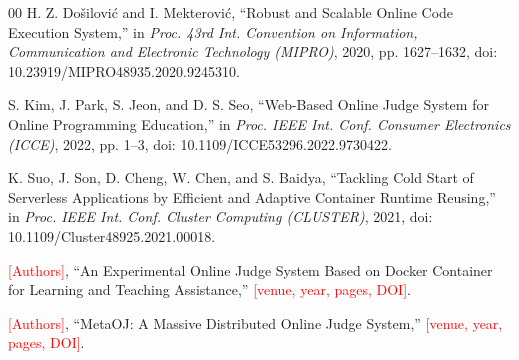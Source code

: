 \documentclass[conference]{IEEEtran}
\newcommand{\tbd}[1]{\textcolor{red}{#1}}
\begin{document}
\begin{thebibliography}{00}
 H. Z. Do\v{s}ilovi\'{c} and I. Mekterovi\'{c}, ``Robust and Scalable Online Code Execution System,'' in \emph{Proc. 43rd Int. Convention on Information, Communication and Electronic Technology (MIPRO)}, 2020, pp. 1627--1632, doi: 10.23919/MIPRO48935.2020.9245310.

 S. Kim, J. Park, S. Jeon, and D. S. Seo, ``Web-Based Online Judge System for Online Programming Education,'' in \emph{Proc. IEEE Int. Conf. Consumer Electronics (ICCE)}, 2022, pp. 1--3, doi: 10.1109/ICCE53296.2022.9730422.

 K. Suo, J. Son, D. Cheng, W. Chen, and S. Baidya, ``Tackling Cold Start of Serverless Applications by Efficient and Adaptive Container Runtime Reusing,'' in \emph{Proc. IEEE Int. Conf. Cluster Computing (CLUSTER)}, 2021, doi: 10.1109/Cluster48925.2021.00018.

 \tbd{[Authors]}, ``An Experimental Online Judge System Based on Docker Container for Learning and Teaching Assistance,'' \tbd{[venue, year, pages, DOI]}.

 \tbd{[Authors]}, ``MetaOJ: A Massive Distributed Online Judge System,'' \tbd{[venue, year, pages, DOI]}.
\end{thebibliography}
\end{document}
